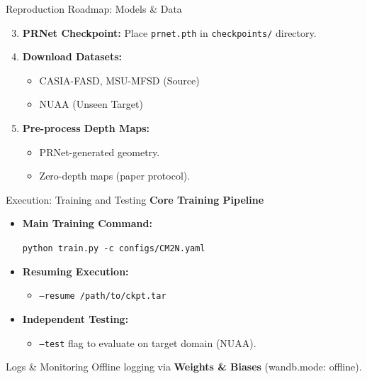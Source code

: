 \begin{frame}{Reproduction Roadmap: Models \& Data}
    \begin{enumerate}
        \setcounter{enumi}{2}
        \item \textbf{PRNet Checkpoint:} Place \texttt{prnet.pth} in \texttt{checkpoints/} directory.
        \item \textbf{Download Datasets:}
            \begin{itemize}
                \item CASIA-FASD, MSU-MFSD (Source)
                \item NUAA (Unseen Target)
            \end{itemize}
        \item \textbf{Pre-process Depth Maps:}
            \begin{itemize}
                \item {} PRNet-generated geometry.
                \item {} Zero-depth maps (paper protocol).
            \end{itemize}
    \end{enumerate}
\end{frame}

\begin{frame}{Execution: Training and Testing}
    \textbf{Core Training Pipeline}
    \begin{itemize}
        \item \textbf{Main Training Command:}
            \begin{exampleblock}{}
                \texttt{python train.py -c configs/CM2N.yaml}
            \end{exampleblock}
        \item \textbf{Resuming Execution:}
            \begin{itemize}
                \item \texttt{--resume /path/to/ckpt.tar}
            \end{itemize}
        \item \textbf{Independent Testing:}
            \begin{itemize}
                \item \texttt{--test} flag to evaluate on target domain (NUAA).
            \end{itemize}
    \end{itemize}
    \vfill
    \begin{alertblock}{Logs \& Monitoring}
        Offline logging via \textbf{Weights \& Biases} (wandb.mode: offline).
    \end{alertblock}
\end{frame}

